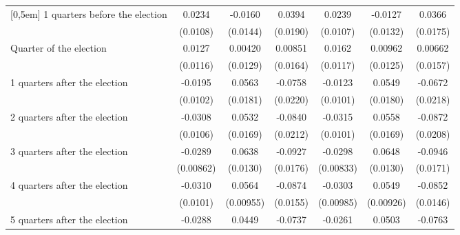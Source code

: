 \begin{table}[!ht]
\begin{tabular}{l*{6}{c}}
[0,5em]
 1 quarters before the election&      0.0234\sym{*}  &     -0.0160         &      0.0394\sym{*}  &      0.0239\sym{*}  &     -0.0127         &      0.0366\sym{*}  \\
                    &    (0.0108)         &    (0.0144)         &    (0.0190)         &    (0.0107)         &    (0.0132)         &    (0.0175)         \\
[0,5em]
Quarter of the election&      0.0127         &     0.00420         &     0.00851         &      0.0162         &     0.00962         &     0.00662         \\
                    &    (0.0116)         &    (0.0129)         &    (0.0164)         &    (0.0117)         &    (0.0125)         &    (0.0157)         \\
[0,5em]
 1 quarters after the election&     -0.0195         &      0.0563\sym{**} &     -0.0758\sym{***}&     -0.0123         &      0.0549\sym{**} &     -0.0672\sym{**} \\
                    &    (0.0102)         &    (0.0181)         &    (0.0220)         &    (0.0101)         &    (0.0180)         &    (0.0218)         \\
[0,5em]
 2 quarters after the election&     -0.0308\sym{**} &      0.0532\sym{**} &     -0.0840\sym{***}&     -0.0315\sym{**} &      0.0558\sym{***}&     -0.0872\sym{***}\\
                    &    (0.0106)         &    (0.0169)         &    (0.0212)         &    (0.0101)         &    (0.0169)         &    (0.0208)         \\
[0,5em]
 3 quarters after the election&     -0.0289\sym{***}&      0.0638\sym{***}&     -0.0927\sym{***}&     -0.0298\sym{***}&      0.0648\sym{***}&     -0.0946\sym{***}\\
                    &   (0.00862)         &    (0.0130)         &    (0.0176)         &   (0.00833)         &    (0.0130)         &    (0.0171)         \\
[0,5em]
 4 quarters after the election&     -0.0310\sym{**} &      0.0564\sym{***}&     -0.0874\sym{***}&     -0.0303\sym{**} &      0.0549\sym{***}&     -0.0852\sym{***}\\
                    &    (0.0101)         &   (0.00955)         &    (0.0155)         &   (0.00985)         &   (0.00926)         &    (0.0146)         \\
[0,5em]
 5 quarters after the election&     -0.0288\sym{**} &      0.0449\sym{**} &     -0.0737\sym{***}&     -0.0261\sym{*}  &      0.0503\sym{***}&     -0.0763\sym{***}\\

\end{tabular}
\end{table}
